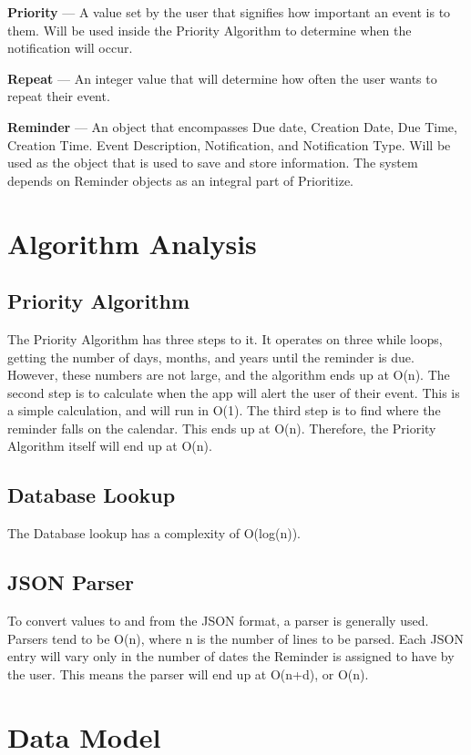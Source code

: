 \documentclass[12pt]{article}
\begin{document}
\textbf{Priority} --- A value set by the user that signifies how important an event is to them. Will be used inside the Priority Algorithm to determine when the notification will occur.

\textbf{Repeat} --- An integer value that will determine how often the user wants to repeat their event.

\textbf{Reminder} --- An object that encompasses Due date, Creation Date, Due Time, Creation Time. Event Description, Notification, and Notification Type. Will be used as the object that is used to save and store information. The system depends on Reminder objects as an integral part of Prioritize.



\section{Algorithm Analysis}
\subsection{Priority Algorithm}
The Priority Algorithm has three steps to it. It operates on three while loops, getting the number of days, months, and years until the reminder is due. However, these numbers are not large, and the algorithm ends up at O(n). The second step is to calculate when the app will alert the user of their event. This is a simple calculation, and will run in O(1). The third step is to find where the reminder falls on the calendar. This ends up at O(n). Therefore, the Priority Algorithm itself will end up at O(n).

\subsection{Database Lookup}
The Database lookup has a complexity of O(log(n)).

\subsection{JSON Parser}
To convert values to and from the JSON format, a parser is generally used. Parsers tend to be O(n), where n is the number of lines to be parsed. Each JSON entry will vary only in the number of dates the Reminder is assigned to have by the user. This means the parser will end up at O(n+d), or O(n).

\section{Data Model}
\end{document}
